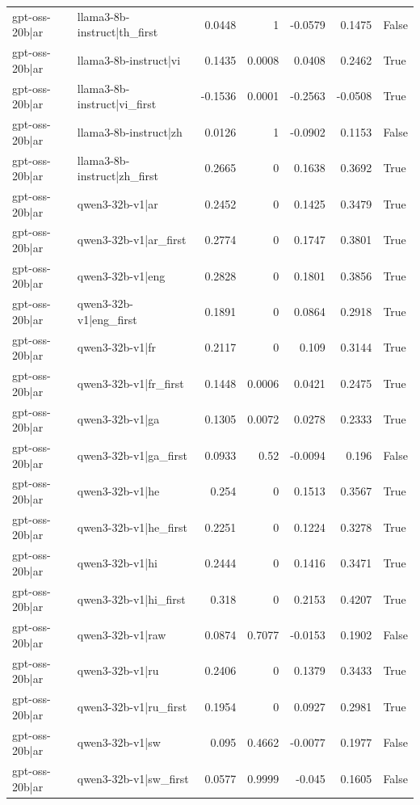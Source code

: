 \begin{table}
\begin{tabular}{l l r r r r l}
gpt-oss-20b|ar & llama3-8b-instruct|th_first & 0.0448 & 1 & -0.0579 & 0.1475 & False \\
gpt-oss-20b|ar & llama3-8b-instruct|vi & 0.1435 & 0.0008 & 0.0408 & 0.2462 & True \\
gpt-oss-20b|ar & llama3-8b-instruct|vi_first & -0.1536 & 0.0001 & -0.2563 & -0.0508 & True \\
gpt-oss-20b|ar & llama3-8b-instruct|zh & 0.0126 & 1 & -0.0902 & 0.1153 & False \\
gpt-oss-20b|ar & llama3-8b-instruct|zh_first & 0.2665 & 0 & 0.1638 & 0.3692 & True \\
gpt-oss-20b|ar & qwen3-32b-v1|ar & 0.2452 & 0 & 0.1425 & 0.3479 & True \\
gpt-oss-20b|ar & qwen3-32b-v1|ar_first & 0.2774 & 0 & 0.1747 & 0.3801 & True \\
gpt-oss-20b|ar & qwen3-32b-v1|eng & 0.2828 & 0 & 0.1801 & 0.3856 & True \\
gpt-oss-20b|ar & qwen3-32b-v1|eng_first & 0.1891 & 0 & 0.0864 & 0.2918 & True \\
gpt-oss-20b|ar & qwen3-32b-v1|fr & 0.2117 & 0 & 0.109 & 0.3144 & True \\
gpt-oss-20b|ar & qwen3-32b-v1|fr_first & 0.1448 & 0.0006 & 0.0421 & 0.2475 & True \\
gpt-oss-20b|ar & qwen3-32b-v1|ga & 0.1305 & 0.0072 & 0.0278 & 0.2333 & True \\
gpt-oss-20b|ar & qwen3-32b-v1|ga_first & 0.0933 & 0.52 & -0.0094 & 0.196 & False \\
gpt-oss-20b|ar & qwen3-32b-v1|he & 0.254 & 0 & 0.1513 & 0.3567 & True \\
gpt-oss-20b|ar & qwen3-32b-v1|he_first & 0.2251 & 0 & 0.1224 & 0.3278 & True \\
gpt-oss-20b|ar & qwen3-32b-v1|hi & 0.2444 & 0 & 0.1416 & 0.3471 & True \\
gpt-oss-20b|ar & qwen3-32b-v1|hi_first & 0.318 & 0 & 0.2153 & 0.4207 & True \\
gpt-oss-20b|ar & qwen3-32b-v1|raw & 0.0874 & 0.7077 & -0.0153 & 0.1902 & False \\
gpt-oss-20b|ar & qwen3-32b-v1|ru & 0.2406 & 0 & 0.1379 & 0.3433 & True \\
gpt-oss-20b|ar & qwen3-32b-v1|ru_first & 0.1954 & 0 & 0.0927 & 0.2981 & True \\
gpt-oss-20b|ar & qwen3-32b-v1|sw & 0.095 & 0.4662 & -0.0077 & 0.1977 & False \\
gpt-oss-20b|ar & qwen3-32b-v1|sw_first & 0.0577 & 0.9999 & -0.045 & 0.1605 & False \\

\end{tabular}
\end{table}

